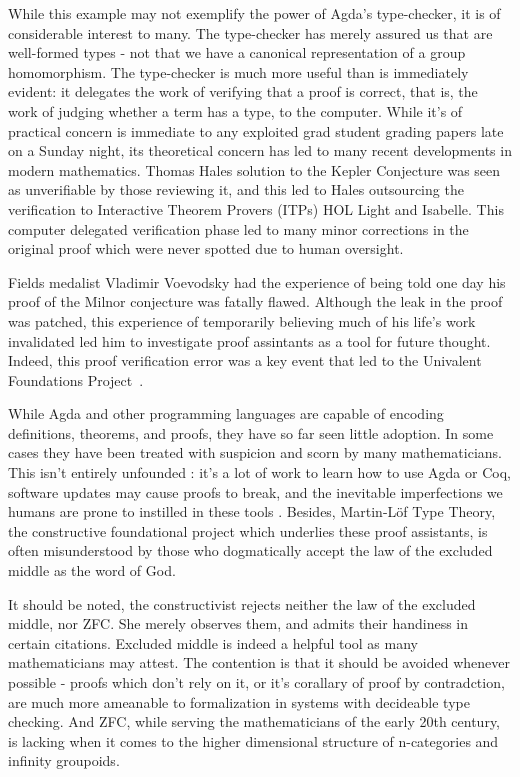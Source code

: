 While this example may not exemplify the power of Agda's type-checker, it is of
considerable interest to many. The type-checker has merely assured us that
 are well-formed types - not that we have a canonical representation
of a group homomorphism. The type-checker is much more useful than is
immediately evident: it delegates the work of verifying that a proof is correct,
that is, the work of judging whether a term has a type, to the computer. While
it's of practical concern is immediate to any exploited grad student grading
papers late on a Sunday night, its theoretical concern has led to many recent
developments in modern mathematics. Thomas Hales solution to the Kepler
Conjecture was seen as unverifiable by those reviewing it, and this led to Hales
outsourcing the verification to Interactive Theorem Provers (ITPs) HOL Light and
Isabelle. This computer delegated verification phase led to many minor
corrections in the original proof which were never spotted due to human
oversight.

Fields medalist Vladimir Voevodsky had the experience of being told one day
his proof of the Milnor conjecture was fatally flawed. Although the leak in the
proof was patched, this experience of temporarily believing much of his life's
work invalidated led him to investigate proof assintants as a tool for future
thought. Indeed, this proof verification error was a key event that led to the
Univalent Foundations
Project~\cite{theunivalentfoundationsprogram-homotopytypetheory-2013}.

While Agda and other programming languages are capable of encoding definitions,
theorems, and proofs, they have so far seen little adoption. In some cases they
have been treated with suspicion and scorn by many mathematicians. This isn't
entirely unfounded : it's a lot of work to learn how to use Agda or Coq,
software updates may cause proofs to break, and the inevitable imperfections we
humans are prone to instilled in these tools . Besides, Martin-Löf Type Theory,
the constructive foundational project which underlies these proof assistants, is
often misunderstood by those who dogmatically accept the law of the excluded
middle as the word of God.

It should be noted, the constructivist rejects neither the law of the excluded
middle, nor ZFC. She merely observes them, and admits their handiness in certain
citations. Excluded middle is indeed a helpful tool as many mathematicians
may attest. The contention is that it should be avoided whenever possible -
proofs which don't rely on it, or it's corallary of proof by contradction, are
much more ameanable to formalization in systems with decideable type checking.
And ZFC, while serving the mathematicians of the early 20th century, is 
lacking when it comes to the higher dimensional structure of n-categories and
infinity groupoids.

